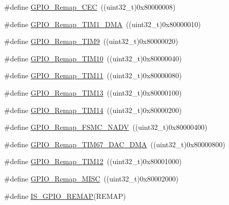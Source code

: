 \begin{DoxyCompactItemize}
\item 
\#define \mbox{\hyperlink{group___g_p_i_o___remap__define_gac5961690908d4a0737e82b5a7d271b9b}{G\+P\+I\+O\+\_\+\+Remap\+\_\+\+C\+EC}}~((uint32\+\_\+t)0x80000008)
\item 
\#define \mbox{\hyperlink{group___g_p_i_o___remap__define_ga255adf908d7d530267707fee39ba2026}{G\+P\+I\+O\+\_\+\+Remap\+\_\+\+T\+I\+M1\+\_\+\+D\+MA}}~((uint32\+\_\+t)0x80000010)
\item 
\#define \mbox{\hyperlink{group___g_p_i_o___remap__define_gadfed4d88bc9a4093d16ce64a85b6051a}{G\+P\+I\+O\+\_\+\+Remap\+\_\+\+T\+I\+M9}}~((uint32\+\_\+t)0x80000020)
\item 
\#define \mbox{\hyperlink{group___g_p_i_o___remap__define_gac94252266a8fcb9ce7b55b5c55464110}{G\+P\+I\+O\+\_\+\+Remap\+\_\+\+T\+I\+M10}}~((uint32\+\_\+t)0x80000040)
\item 
\#define \mbox{\hyperlink{group___g_p_i_o___remap__define_ga0f308f1bb45e4c473766603b4bef47f8}{G\+P\+I\+O\+\_\+\+Remap\+\_\+\+T\+I\+M11}}~((uint32\+\_\+t)0x80000080)
\item 
\#define \mbox{\hyperlink{group___g_p_i_o___remap__define_ga72f5da86ed94f3be978cd841f7cd37cb}{G\+P\+I\+O\+\_\+\+Remap\+\_\+\+T\+I\+M13}}~((uint32\+\_\+t)0x80000100)
\item 
\#define \mbox{\hyperlink{group___g_p_i_o___remap__define_gaa2ae554ed69ad3368c2cd7db678b3fd0}{G\+P\+I\+O\+\_\+\+Remap\+\_\+\+T\+I\+M14}}~((uint32\+\_\+t)0x80000200)
\item 
\#define \mbox{\hyperlink{group___g_p_i_o___remap__define_ga97088efda8b8a057f4ba58de8f51625f}{G\+P\+I\+O\+\_\+\+Remap\+\_\+\+F\+S\+M\+C\+\_\+\+N\+A\+DV}}~((uint32\+\_\+t)0x80000400)
\item 
\#define \mbox{\hyperlink{group___g_p_i_o___remap__define_gae69d46a269c2284c8cc6a90742e89b12}{G\+P\+I\+O\+\_\+\+Remap\+\_\+\+T\+I\+M67\+\_\+\+D\+A\+C\+\_\+\+D\+MA}}~((uint32\+\_\+t)0x80000800)
\item 
\#define \mbox{\hyperlink{group___g_p_i_o___remap__define_ga44d3d86a684f62f9142d34ea5975a637}{G\+P\+I\+O\+\_\+\+Remap\+\_\+\+T\+I\+M12}}~((uint32\+\_\+t)0x80001000)
\item 
\#define \mbox{\hyperlink{group___g_p_i_o___remap__define_ga543f3626303b3452528cb622ad088d26}{G\+P\+I\+O\+\_\+\+Remap\+\_\+\+M\+I\+SC}}~((uint32\+\_\+t)0x80002000)
\item 
\#define \mbox{\hyperlink{group___g_p_i_o___remap__define_gaccf4664689f281fd4ee91ef16c9dc985}{I\+S\+\_\+\+G\+P\+I\+O\+\_\+\+R\+E\+M\+AP}}(R\+E\+M\+AP)
\end{DoxyCompactItemize}


